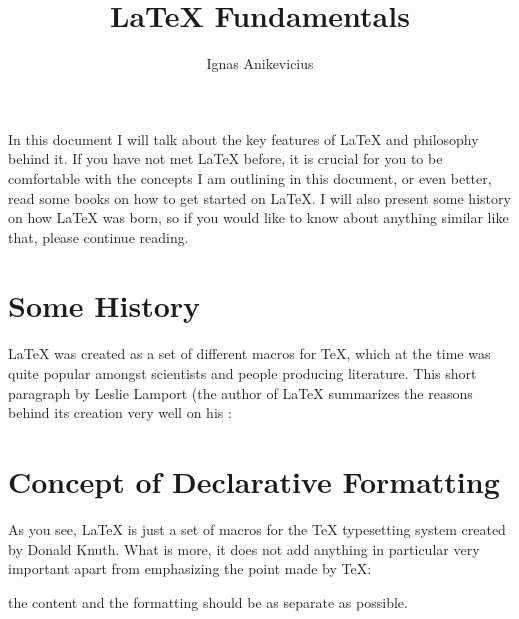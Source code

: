 \documentclass[
    draft
    ]{scrartcl}
\title{\LaTeX{} Fundamentals}
\author{Ignas Anikevicius}
\renewcommand{\quote}[1]{
\begin{center}
    \colorbox{myyellowl}{
    \begin{minipage}[t]{.92\textwidth}
        #1
    \end{minipage}
    }
\end{center}
}
\begin{document}
\maketitle

\tableofcontents
\listoftodos
\clearpage

%
In this document I will talk about the key features of \LaTeX{} and philosophy
    behind it.
%
If you have not met \LaTeX{} before, it is crucial for you to be comfortable
    with the concepts I am outlining in this document, or even better, read some
    books on how to get started on \LaTeX{}.
%
I will also present some history on how \LaTeX{} was born, so if you would like
    to know about anything similar like that, please continue reading.

\section{Some History}

%
\LaTeX{} was created as a set of different macros for \TeX{}, which at the time
    was quite popular amongst scientists and people producing literature.
%
This short paragraph by Leslie Lamport (the author of \LaTeX{} summarizes the
    reasons behind its creation very well on his
    :

\quote{}

\section{Concept of Declarative Formatting}

%
As you see, \LaTeX{} is just a set of macros for the \TeX{} typesetting system
    created by Donald Knuth.
%
What is more, it does not add anything in particular very important apart from
    emphasizing the point made by \TeX{}:
%
\quote{the content and the formatting should be as separate as possible.}
\end{document}
